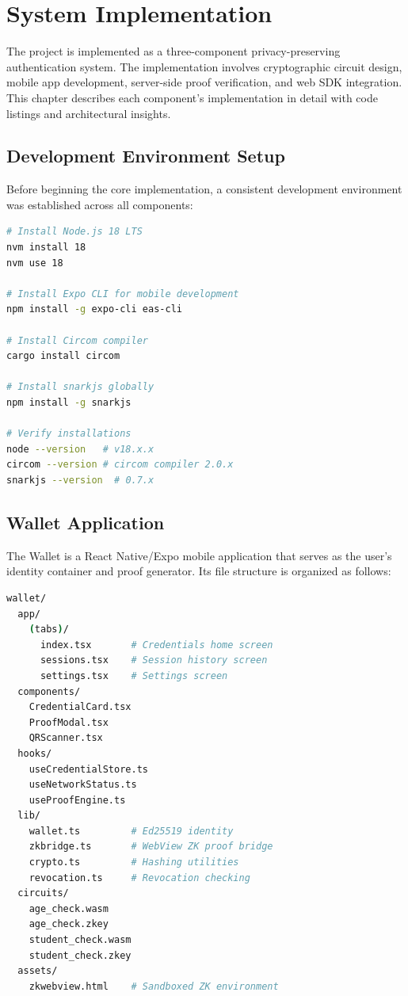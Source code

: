 \chapter{System Implementation}

The project is implemented as a three-component privacy-preserving authentication system. The implementation involves cryptographic circuit design, mobile app development, server-side proof verification, and web SDK integration. This chapter describes each component's implementation in detail with code listings and architectural insights.

\section{Development Environment Setup}

Before beginning the core implementation, a consistent development environment was established across all components:

\begin{lstlisting}[language=bash, caption={Development Environment Initialization}]
# Install Node.js 18 LTS
nvm install 18
nvm use 18

# Install Expo CLI for mobile development
npm install -g expo-cli eas-cli

# Install Circom compiler
cargo install circom

# Install snarkjs globally
npm install -g snarkjs

# Verify installations
node --version   # v18.x.x
circom --version # circom compiler 2.0.x
snarkjs --version  # 0.7.x
\end{lstlisting}

\section{Wallet Application}

The Wallet is a React Native/Expo mobile application that serves as the user's identity container and proof generator. Its file structure is organized as follows:

\begin{lstlisting}[language=bash, caption={Wallet Application File Structure}]
wallet/
  app/
    (tabs)/
      index.tsx       # Credentials home screen
      sessions.tsx    # Session history screen
      settings.tsx    # Settings screen
  components/
    CredentialCard.tsx
    ProofModal.tsx
    QRScanner.tsx
  hooks/
    useCredentialStore.ts
    useNetworkStatus.ts
    useProofEngine.ts
  lib/
    wallet.ts         # Ed25519 identity
    zkbridge.ts       # WebView ZK proof bridge
    crypto.ts         # Hashing utilities
    revocation.ts     # Revocation checking
  circuits/
    age_check.wasm
    age_check.zkey
    student_check.wasm
    student_check.zkey
  assets/
    zkwebview.html    # Sandboxed ZK environment
\end{lstlisting}

